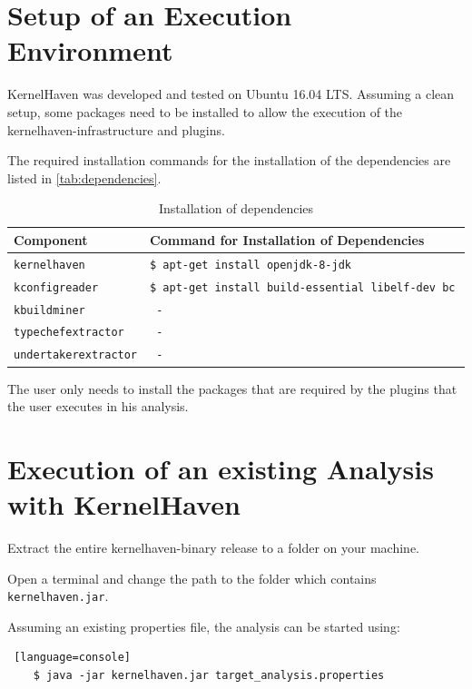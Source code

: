 \chapter{Setup of an Execution Environment} \label{setup}

KernelHaven was developed and tested on Ubuntu 16.04 LTS. Assuming a clean setup, some packages need to be installed to allow the execution of the kernelhaven-infrastructure and plugins.

The required installation commands for the installation of the dependencies are listed in \autoref{tab:dependencies}. 

\begin{table}[h!] %
    \caption{Installation of dependencies} \label{tab:dependencies}
    \begin{tabularx}{\textwidth}{|p{}|p{}|}\hline
        \textbf{Component} & \textbf{Command for Installation of Dependencies} \\ \hline \hline
        \texttt{kernelhaven}  & \texttt{\$ apt-get install  openjdk-8-jdk }  \\ \hline
        \texttt{kconfigreader}  & \texttt{\$ apt-get install  build-essential libelf-dev bc }  \\ \hline
        \texttt{kbuildminer}  & \texttt{ - }  \\ \hline
        \texttt{typechefextractor}  & \texttt{ - }  \\ \hline
        \texttt{undertakerextractor}  & \texttt{ - }  \\ \hline
    \end{tabularx}
\end{table}

The user only needs to install the packages that are required by the plugins that the user executes in his analysis. 

\chapter{Execution of an existing Analysis with KernelHaven}

Extract the entire kernelhaven-binary release to a folder on your machine.

Open a terminal and change the path to the folder which contains \texttt{kernelhaven.jar}.

Assuming an existing properties file, the analysis can be started using:

\begin{lstlisting} [language=console]
    $ java -jar kernelhaven.jar target_analysis.properties
\end{lstlisting}

